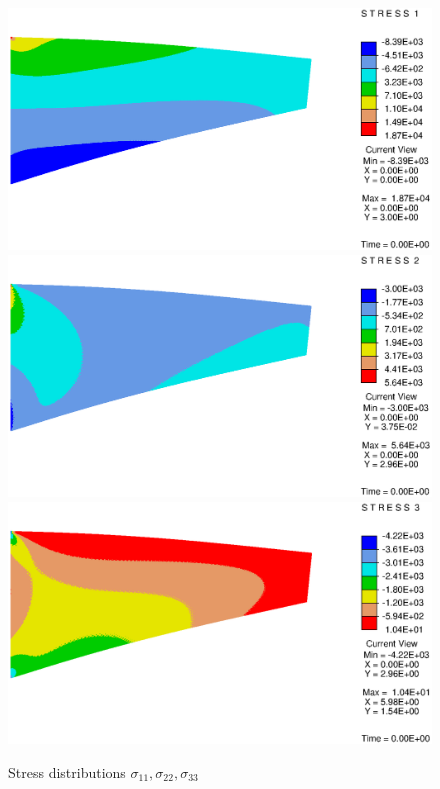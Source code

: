 \documentclass[12pt,twoside]{article}
\begin{document}
\begin{figure}[h]
\centering
\includegraphics[height=0.32\textheight]{stress11.eps}\\[5mm]
\includegraphics[height=0.32\textheight]{stress22.eps}\\[5mm]
\includegraphics[height=0.32\textheight]{stress33.eps}
\caption{Stress distributions $\sigma_{11}, \sigma_{22}, \sigma_{33}$}
\end{figure}
\end{document}
